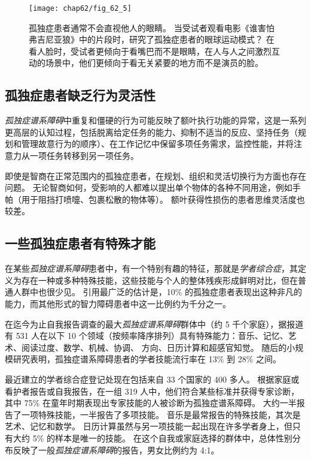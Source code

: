 \begin{figure}[htbp]
	\centering
	\texttt{[image: chap62/fig\_62\_5]}
	\caption{孤独症患者通常不会直视他人的眼睛。
		当受试者观看电影《谁害怕弗吉尼亚狼》中的片段时，研究了孤独症患者的眼球运动模式？
		在看人脸时，受试者更倾向于看嘴巴而不是眼睛，在人与人之间激烈互动的场景中，他们更倾向于看无关紧要的地方而不是演员的脸\cite{klin2002defining}。}
	\label{fig:62_5}
\end{figure}



\subsection{孤独症患者缺乏行为灵活性}

\textit{孤独症谱系障碍}中重复和僵硬的行为可能反映了额叶执行功能的异常，这是一系列更高层的认知过程，包括脱离给定任务的能力、抑制不适当的反应、坚持任务（规划和管理故意行为的顺序）、在工作记忆中保留多项任务需求，监控性能，并将注意力从一项任务转移到另一项任务。


即使是智商在正常范围内的孤独症患者，在规划、组织和灵活切换行为方面也存在问题。
无论智商如何，受影响的人都难以提出单个物体的各种不同用途，例如手帕（用于阻挡打喷嚏、包裹松散的物体等）。
额叶获得性损伤的患者思维灵活度也较差。



\subsection{一些孤独症患者有特殊才能}

在某些\textit{孤独症谱系障碍}患者中，有一个特别有趣的特征，那就是\textit{学者综合症}，其定义为存在一种或多种特殊技能，这些技能与个人的整体残疾形成鲜明对比，但在普通人群中也很少见。
引用最广泛的估计是，10\% 的孤独症患者表现出这种非凡的能力，而其他形式的智力障碍患者中这一比例约为千分之一。


在迄今为止自我报告调查的最大\textit{孤独症谱系障碍}群体中（约 5 千个家庭），据报道有 531 人在以下 10 个领域（按频率降序排列）具有特殊能力：音乐、记忆、艺术、阅读过度、数学、机械、协调、 方向、日历计算和超感官知觉。
随后的小规模研究表明，孤独症谱系障碍患者的学者技能流行率在 13\% 到 28\% 之间。


最近建立的学者综合症登记处现在包括来自 33 个国家的 400 多人。
根据家庭或看护者报告或自我报告，在一组 319 人中，他们符合某些标准并获得专家诊断，其中 75\% 在童年时期表现出专家技能的人被诊断为孤独症谱系障碍。
大约一半报告了一项特殊技能，一半报告了多项技能。
音乐是最常报告的特殊技能，其次是艺术、记忆和数学。
日历计算虽然与另一项技能一起出现在许多学者身上，但只有大约 5\% 的样本是唯一的技能。
在这个自我或家庭选择的群体中，总体性别分布反映了一般\textit{孤独症谱系障碍}的报告，男女比例约为 4:1。


